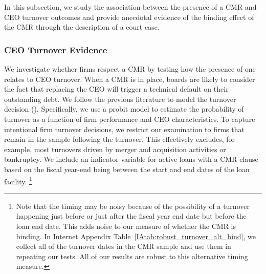 \documentclass[a4paper,12pt]{article}
\begin{document}
In this subsection, we study the association between the presence of a CMR and CEO turnover outcomes and provide anecdotal evidence of the binding effect of the CMR through the description of a court case.

\subsubsection{CEO Turnover Evidence}

We investigate whether firms respect a CMR by testing how the presence of one relates to CEO turnover.
When a CMR is in place, boards are likely to consider the fact that replacing the CEO will trigger a technical default on their outstanding debt.
We follow the previous literature to model the turnover decision (\citet{Parrino_1997, Kaplan_2012, Jenter_2015}).
Specifically, we use a probit model to estimate the probability of turnover as a function of firm performance and CEO characteristics.
To capture intentional firm turnover decisions, we restrict our examination to firms that remain in the sample following the turnover.
This effectively excludes, for example, most turnovers driven by merger and acquisition activities or bankruptcy.
We include an indicator variable for active loans with a CMR clause based on the fiscal year-end being between the start and end dates of the loan facility.%
    \footnote{Note that the timing may be noisy because of the possibility of a turnover happening just before or just after the fiscal year end date but before the loan end date. This adds noise to our measure of whether the CMR is binding. In Internet Appendix Table~\ref{IAtab:robust_turnover_alt_bind}, we collect all of the turnover dates in the CMR sample and use them in repeating our tests. All of our results are robust to this alternative timing measure.}
\end{document}

